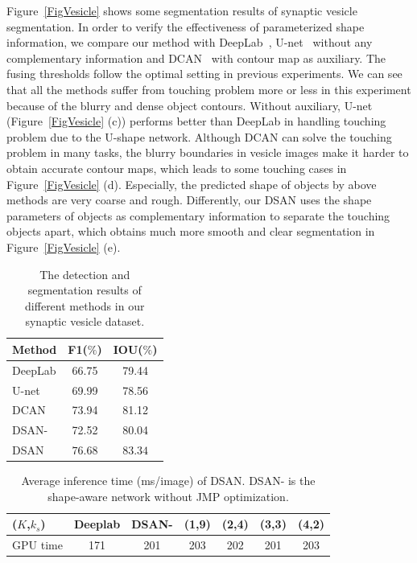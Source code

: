 Figure~\ref{FigVesicle} shows some segmentation results of synaptic vesicle segmentation.
In order to verify the effectiveness of parameterized shape information, we compare our method with DeepLab~\cite{Chen2014a}, U-net~\cite{Ronneberger2015} without any complementary information and DCAN~\cite{Chen2016a} with contour map as auxiliary.
The fusing thresholds follow the optimal setting in previous experiments.
%
We can see that all the methods suffer from touching problem more or less in this experiment because of the blurry and dense object contours.
Without auxiliary, U-net (Figure~\ref{FigVesicle} (c)) performs better than DeepLab in handling touching problem due to the U-shape network.
Although DCAN can solve the touching problem in many tasks, the blurry boundaries in vesicle images make it harder to obtain accurate contour maps, which leads to some touching cases in Figure~\ref{FigVesicle} (d).
Especially, the predicted shape of objects by above methods are very coarse and rough.
Differently, our DSAN uses the shape parameters of objects as complementary information to separate the touching objects apart, which obtains much more smooth and clear segmentation in Figure~\ref{FigVesicle} (e).



\begin{table}
\begin{center}
\begin{tabular}{lcc}
\hline
Method & F1($\%$) & IOU($\%$) \\
\hline
DeepLab & 66.75 & 79.44 \\
U-net & 69.99 & 78.56 \\
DCAN & 73.94 & 81.12 \\
DSAN- & 72.52 & 80.04 \\
DSAN & $\mathbf{76.68}$ & $\mathbf{83.34}$\\
\hline
\end{tabular}
\end{center}
\caption{The detection and segmentation results of different methods in our synaptic vesicle dataset.}
\label{tab:vesicle}
\end{table}


\begin{table}
\begin{center}
\begin{tabular}{l|cccccc}
\hline
($K$,$k_s$) &Deeplab& DSAN- & (1,9)& (2,4) & (3,3) & (4,2) \\
\hline
GPU time &171& 201 & 203 & 202 & 201& 203 \\
\hline
\end{tabular}
\end{center}
\caption{Average inference time (ms/image) of DSAN. DSAN- is the shape-aware network without JMP optimization.}
\label{tab:time}
\end{table}

